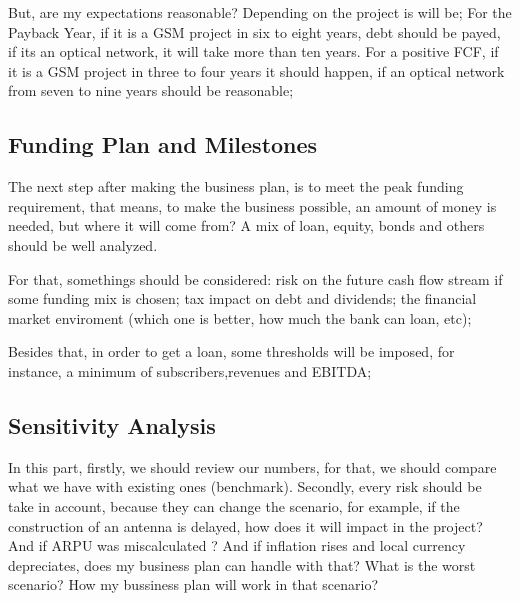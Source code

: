 \documentclass[a4paper,11pt]{article}
\begin{document}
But, are my expectations reasonable? Depending on the project is will be;
For the  Payback Year, if it  is a GSM project  in six to eight  years, debt
should be payed, if its an optical network, it will take more than ten years.
For a  positive FCF, if  it is a  GSM project in three  to four years  it should
happen, if an optical network from seven to nine years should be reasonable;

\subsection{Funding Plan and Milestones}
The next step after making the business plan, is to meet the peak funding requirement, that means, to make the business possible, an amount of money is needed, but where it will come from? A mix of loan, equity, bonds and others should be well analyzed.

For that, somethings should be considered: risk on the future cash flow stream if some funding mix is chosen; tax impact on debt and dividends; the financial market enviroment (which one is better, how much the bank can loan, etc);

Besides that, in order to get a loan, some thresholds will be imposed, for instance, a minimum of subscribers,revenues and  EBITDA;
\subsection{Sensitivity Analysis}

In this part, firstly, we should review our numbers, for that, we should compare what we have with existing ones (benchmark).
Secondly, every risk should be take in account,
because they  can change the scenario,  for example, if the  construction of an
antenna  is  delayed,  how  does  it  will  impact in  the  project?  And  if ARPU  was  miscalculated ? 
And if inflation rises and local currency depreciates,
does my business plan can handle with that?
What is the worst scenario? How my bussiness plan will work in that scenario?
\end{document}
